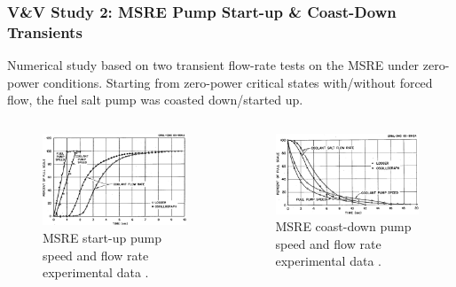 \begin{frame}
  \frametitle{V\&V Study 2: MSRE Pump Start-up \& Coast-Down Transients}
  Numerical study based on two transient flow-rate tests on the MSRE under zero-power
  conditions. Starting from zero-power critical states with/without forced flow, the fuel salt pump
  was coasted down/started up.
  \begin{columns}
    \column[t]{5.5cm}
    \begin{figure}
      \centering
      \includegraphics[width=.8\columnwidth]{images/msre-startup}
      \caption{MSRE start-up pump speed and flow rate experimental data
      \cite{prince_zero-power_1968}.}
    \end{figure}
    \column[t]{5.5cm}
    \begin{figure}
      \centering
      \includegraphics[width=.95\columnwidth]{images/msre-coastdown}
      \caption{MSRE coast-down pump speed and flow rate experimental data
      \cite{prince_zero-power_1968}.}
    \end{figure}
  \end{columns}
\end{frame}

